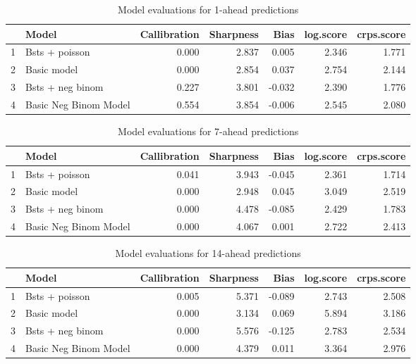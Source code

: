 \begin{table}[ht]
\centering
\begin{tabular}{rlrrrrr}
  \hline
 & Model & Callibration & Sharpness & Bias & log.score & crps.score \\ 
  \hline
1 & Bsts + poisson  & 0.000 & 2.837 & 0.005 & 2.346 & 1.771 \\ 
  2 & Basic model & 0.000 & 2.854 & 0.037 & 2.754 & 2.144 \\ 
  3 & Bsts + neg binom  & 0.227 & 3.801 & -0.032 & 2.390 & 1.776 \\ 
  4 & Basic Neg Binom Model & 0.554 & 3.854 & -0.006 & 2.545 & 2.080 \\ 
   \hline
\end{tabular}
\caption{Model evaluations for 1-ahead predictions} 
\label{tab:1_evo}
\end{table}
\begin{table}[ht]
\centering
\begin{tabular}{rlrrrrr}
  \hline
 & Model & Callibration & Sharpness & Bias & log.score & crps.score \\ 
  \hline
1 & Bsts + poisson  & 0.041 & 3.943 & -0.045 & 2.361 & 1.714 \\ 
  2 & Basic model & 0.000 & 2.948 & 0.045 & 3.049 & 2.519 \\ 
  3 & Bsts + neg binom  & 0.000 & 4.478 & -0.085 & 2.429 & 1.783 \\ 
  4 & Basic Neg Binom Model & 0.000 & 4.067 & 0.001 & 2.722 & 2.413 \\ 
   \hline
\end{tabular}
\caption{Model evaluations for 7-ahead predictions} 
\label{tab:7_evo}
\end{table}
\begin{table}[ht]
\centering
\begin{tabular}{rlrrrrr}
  \hline
 & Model & Callibration & Sharpness & Bias & log.score & crps.score \\ 
  \hline
1 & Bsts + poisson  & 0.005 & 5.371 & -0.089 & 2.743 & 2.508 \\ 
  2 & Basic model & 0.000 & 3.134 & 0.069 & 5.894 & 3.186 \\ 
  3 & Bsts + neg binom  & 0.000 & 5.576 & -0.125 & 2.783 & 2.534 \\ 
  4 & Basic Neg Binom Model & 0.000 & 4.379 & 0.011 & 3.364 & 2.976 \\ 
   \hline
\end{tabular}
\caption{Model evaluations for 14-ahead predictions} 
\label{tab:14_evo}
\end{table}

